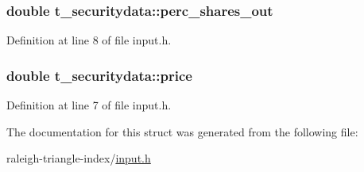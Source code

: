 \subsubsection[{\texorpdfstring{perc\+\_\+shares\+\_\+out}{perc_shares_out}}]{\setlength{\rightskip}{0pt plus 5cm}double t\+\_\+securitydata\+::perc\+\_\+shares\+\_\+out}\hypertarget{structt__securitydata_adb0f9c31e35cce915edc83683ef2111d}{}\label{structt__securitydata_adb0f9c31e35cce915edc83683ef2111d}


Definition at line 8 of file input.\+h.

\subsubsection[{\texorpdfstring{price}{price}}]{\setlength{\rightskip}{0pt plus 5cm}double t\+\_\+securitydata\+::price}\hypertarget{structt__securitydata_afac1f6cd3e3186f5db6dd9ae5fc5afb6}{}\label{structt__securitydata_afac1f6cd3e3186f5db6dd9ae5fc5afb6}


Definition at line 7 of file input.\+h.



The documentation for this struct was generated from the following file\+:\begin{DoxyCompactItemize}
\item 
raleigh-\/triangle-\/index/\hyperlink{input_8h}{input.\+h}\end{DoxyCompactItemize}
